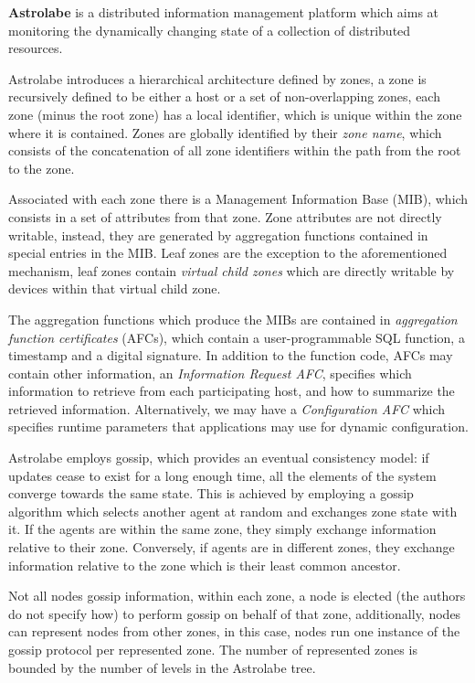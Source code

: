 \textbf{Astrolabe} \cite{Renesse2003} is a distributed information management platform which aims at monitoring the dynamically changing state of a collection of distributed resources. 

Astrolabe introduces a hierarchical architecture defined by zones, a zone is recursively defined to be either a host or a set of non-overlapping zones, each zone (minus the root zone) has a local identifier, which is unique within the zone where it is contained. Zones are globally identified by their \textit{zone name}, which consists of the concatenation of all zone identifiers within the path from the root to the zone.

Associated with each zone there is a Management Information Base (MIB), which consists in a set of attributes from that zone. Zone attributes are not directly writable, instead, they are generated by aggregation functions contained in special entries in the MIB. Leaf zones are the exception to the aforementioned mechanism, leaf zones contain \textit{virtual child zones} which are directly writable by devices within that virtual child zone.

The aggregation functions which produce the MIBs are contained in \textit{aggregation function certificates} (AFCs), which contain a user-programmable SQL function, a timestamp and a digital signature. In addition to the function code, AFCs may contain other information, an \textit{Information Request AFC},  specifies which information to retrieve from each participating host, and how to summarize the retrieved information. Alternatively, we may have a \textit{Configuration AFC} which specifies runtime parameters that applications may use for dynamic configuration.

Astrolabe employs gossip, which provides an eventual consistency model: if updates cease to exist for a long enough time, all the elements of the system  converge towards the same state. This is achieved by employing a gossip algorithm which selects another agent at random and exchanges zone state with it. If the agents are within the same zone, they simply exchange information relative to their zone. Conversely, if agents are in different zones, they exchange information relative to the zone which is their least common ancestor.

Not all nodes gossip information, within each zone, a node is elected (the authors do not specify how) to perform gossip on behalf of that zone, additionally, nodes can represent nodes from other zones, in this case, nodes run one instance of the gossip protocol per represented zone. The number of represented zones is bounded by the number of levels in the Astrolabe tree.

